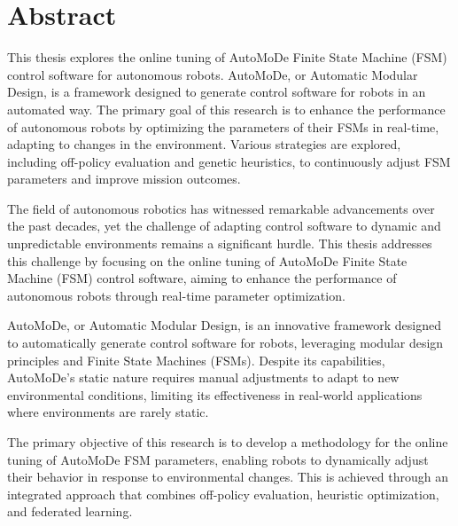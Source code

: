 \documentclass{ULBreport}
\begin{document}


\tableofcontents

\chapter{Abstract}
This thesis explores the online tuning of AutoMoDe Finite State Machine (FSM) control software for autonomous robots. AutoMoDe, or Automatic Modular Design, is a framework designed to generate control software for robots in an automated way. The primary goal of this research is to enhance the performance of autonomous robots by optimizing the parameters of their FSMs in real-time, adapting to changes in the environment. Various strategies are explored, including off-policy evaluation and genetic heuristics, to continuously adjust FSM parameters and improve mission outcomes.


The field of autonomous robotics has witnessed remarkable advancements over the past decades, yet the challenge of adapting control software to dynamic and unpredictable environments remains a significant hurdle. This thesis addresses this challenge by focusing on the online tuning of AutoMoDe Finite State Machine (FSM) control software, aiming to enhance the performance of autonomous robots through real-time parameter optimization.

AutoMoDe, or Automatic Modular Design, is an innovative framework designed to automatically generate control software for robots, leveraging modular design principles and Finite State Machines (FSMs). Despite its capabilities, AutoMoDe's static nature requires manual adjustments to adapt to new environmental conditions, limiting its effectiveness in real-world applications where environments are rarely static.

The primary objective of this research is to develop a methodology for the online tuning of AutoMoDe FSM parameters, enabling robots to dynamically adjust their behavior in response to environmental changes. This is achieved through an integrated approach that combines off-policy evaluation, heuristic optimization, and federated learning.
\end{document}
